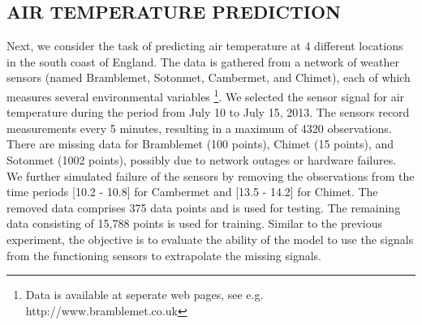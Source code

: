 \subsection{AIR TEMPERATURE PREDICTION}
Next, we consider the task of predicting air temperature at 4 different locations in the south coast of England. 
The data is gathered from a network of weather sensors (named Bramblemet, Sotonmet, Cambermet, and Chimet), each of which measures several environmental variables \citep{osborne2008towards}\footnote{Data is available at seperate web pages, see e.g. http://www.bramblemet.co.uk}.
We selected the sensor signal for air temperature during the period from July 10 to July 15, 2013.
The sensors record measurements every 5 minutes, resulting in a maximum of 4320 observations.
There are missing data for Bramblemet (100 points), Chimet (15 points), and Sotonmet (1002 points), possibly due to network outages or hardware failures.
We further simulated failure of the sensors by removing the observations from the time periods [10.2 - 10.8] for Cambermet and [13.5 - 14.2] for Chimet.
The removed data comprises 375 data points and  is used for testing. 
The remaining data consisting of 15,788 points is used for training.
Similar to the previous experiment, the objective is to evaluate the ability of the model to use the signals from the functioning sensors to extrapolate the missing signals.

